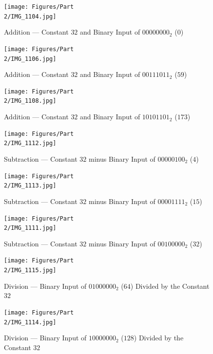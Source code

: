 \documentclass[
	letterpaper, %
	10pt, %
]{CSUniSchoolLabReport}
\begin{document}
\begin{figure}[H]
  \centering
  \texttt{[image: Figures/Part\\ 2/IMG\_1104.jpg]}
  \caption{Addition — Constant $32$ and Binary Input of $00000000_2$ ($0$)}
  \label{fig:7}
\end{figure}

\begin{figure}[H]
  \centering
  \texttt{[image: Figures/Part\\ 2/IMG\_1106.jpg]}
  \caption{Addition — Constant $32$ and Binary Input of $00111011_2$ ($59$)}
  \label{fig:8}
\end{figure}

\begin{figure}[H]
  \centering
  \texttt{[image: Figures/Part\\ 2/IMG\_1108.jpg]}
  \caption{Addition — Constant $32$ and Binary Input of $10101101_2$ ($173$)}
  \label{fig:9}
\end{figure}

\begin{figure}[H]
  \centering
  \texttt{[image: Figures/Part\\ 2/IMG\_1112.jpg]}
  \caption{Subtraction — Constant $32$ minus Binary Input of $00000100_2$ ($4$)}
  \label{fig:10}
\end{figure}

\begin{figure}[H]
  \centering
  \texttt{[image: Figures/Part\\ 2/IMG\_1113.jpg]}
  \caption{Subtraction — Constant $32$ minus Binary Input of $00001111_2$ ($15$)}
  \label{fig:11}
\end{figure}

\begin{figure}[H]
  \centering
  \texttt{[image: Figures/Part\\ 2/IMG\_1111.jpg]}
  \caption{Subtraction — Constant $32$ minus Binary Input of $00100000_2$ ($32$)}
  \label{fig:12}
\end{figure}

\begin{figure}[H]
  \centering
  \texttt{[image: Figures/Part\\ 2/IMG\_1115.jpg]}
  \caption{Division — Binary Input of $01000000_2$ ($64$) Divided by the Constant $32$}
  \label{fig:13}
\end{figure}

\begin{figure}[H]
  \centering
  \texttt{[image: Figures/Part\\ 2/IMG\_1114.jpg]}
  \caption{Division — Binary Input of $10000000_2$ ($128$) Divided by the Constant $32$}
  \label{fig:14}
\end{figure}
\end{document}
